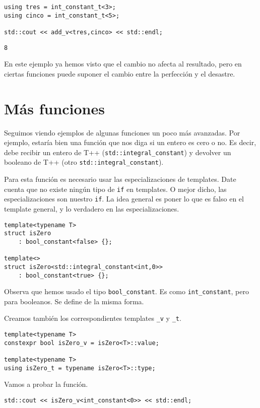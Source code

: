 \documentclass[11pt]{article}
\begin{document}
\begin{verbatim}
using tres = int_constant_t<3>;
using cinco = int_constant_t<5>;

std::cout << add_v<tres,cinco> << std::endl;
\end{verbatim}

\begin{verbatim}
8
\end{verbatim}


En este ejemplo ya hemos visto que el cambio no afecta al resultado, pero en ciertas funciones puede suponer el cambio entre la perfección y el desastre.

\section{Más funciones}
\label{sec:orgca1c5e5}
Seguimos viendo ejemplos de algunas funciones un poco más avanzadas. Por ejemplo, estaría bien una función que nos diga si un entero es cero o no. Es decir, debe recibir un entero de T++ (\texttt{std::integral\_constant}) y devolver un booleano de T++ (otro \texttt{std::integral\_constant}).

Para esta función es necesario usar las especializaciones de templates. Date cuenta que no existe ningún tipo de \texttt{if} en templates. O mejor dicho, las especializaciones son nuestro \texttt{if}. La idea general es poner lo que es falso en el template general, y lo verdadero en las especializaciones.

\begin{verbatim}
template<typename T>
struct isZero
	: bool_constant<false> {};

template<>
struct isZero<std::integral_constant<int,0>>
	: bool_constant<true> {};
\end{verbatim}

Observa que hemos usado el tipo \texttt{bool\_constant}. Es como \texttt{int\_constant}, pero para booleanos. Se define de la misma forma.

Creamos también los correspondientes templates \texttt{\_v} y \texttt{\_t}.

\begin{verbatim}
template<typename T>
constexpr bool isZero_v = isZero<T>::value;

template<typename T>
using isZero_t = typename isZero<T>::type;
\end{verbatim}

Vamos a probar la función.

\begin{verbatim}
std::cout << isZero_v<int_constant<0>> << std::endl;
\end{verbatim}
\end{document}
